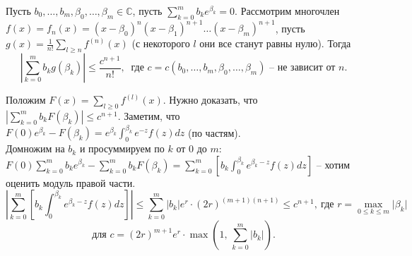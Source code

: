 \begin{lemma} \label{l14_lm7}
	Пусть $b_0,\dots,b_m,\beta_0,\dots,\beta_m \in \mathbb{C}$, пусть $\displaystyle \sum\limits_{k=0}^m b_ke^{\beta_k} = 0$.
	Рассмотрим многочлен $f(x)=f_n(x) = (x-\beta_0)^n(x-\beta_1)^{n+1}\dots(x-\beta_m)^{n+1}$, пусть $\displaystyle g(x) = \frac{1}{n!}\sum\limits_{l \geq n} f^{(n)}(x)$ (с некоторого $l$ они все станут равны нулю). Тогда
	$$\left| \sum\limits_{k=0}^m b_kg(\beta_k) \right| \leq \frac{c^{n+1}}{n!}, \ \text{ где } c=c(b_0,\dots,b_m,\beta_0,\dots,\beta_m) \text{ -- не зависит от } n.$$
\end{lemma}
\begin{pf}
	Положим $\displaystyle F(x) = \sum\limits_{l \geq 0} f^{(l)}(x)$. Нужно доказать, что $\displaystyle \left| \sum\limits_{k=0}^m b_kF(\beta_k) \right| \leq c^{n+1}$.
	Заметим, что $\displaystyle F(0)e^{\beta_k} - F(\beta_k) = e^{\beta_k} \int_0^{\beta_k}e^{-z}f(z)dz$ (по частям).\\
	Домножим на $b_k$ и просуммируем по $k$ от $0$ до $m$:\\
	$\displaystyle F(0)\sum_{k=0}^m b_ke^{\beta_k} - \sum\limits_{k=0}^m b_kF(\beta_k) = \sum\limits_{k=0}^m \left[ b_k\int_0^{\beta_k} e^{\beta_k-z}f(z)dz \right]$ -- хотим оценить модуль правой части.
	$$\left| \sum\limits_{k=0}^m \left[ b_k\int_0^{\beta_k} e^{\beta_k-z}f(z)dz \right] \right| \leq \sum\limits_{k=0}^m |b_k|e^r \cdot (2r)^{(m+1)(n+1)} \leq c^{n+1}, \ \text{где } r=\max\limits_{0\leq k \leq m} \lvert \beta_k \rvert$$
	$$\text{для } c=(2r)^{m+1}e^r\cdot\max\left( 1, \, \sum\limits_{k=0}^m \lvert b_k \rvert \right).$$
\end{pf}

